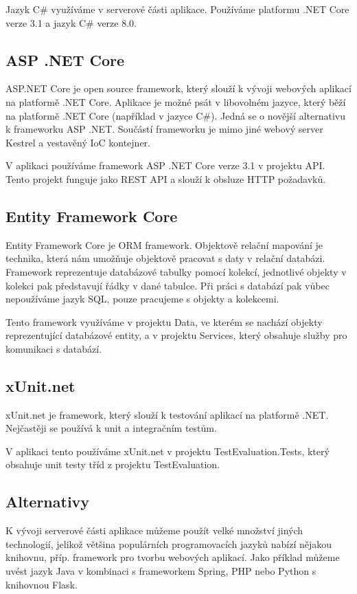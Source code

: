 Jazyk C\# využíváme v serverové části aplikace. Používáme platformu .NET Core verze 3.1 a jazyk C\# verze 8.0.

\subsection{ASP .NET Core}
ASP.NET Core je open source framework, který slouží k vývoji webových aplikací na platformě .NET Core. Aplikace je možné psát v libovolném jazyce, který běží na platformě .NET Core (například v jazyce C\#). Jedná se o novější alternativu k frameworku ASP .NET. Součástí frameworku je mimo jiné webový server Kestrel a vestavěný IoC kontejner.
\cite{AspNetCoreDocs}

V aplikaci používáme framework ASP .NET Core verze 3.1 v projektu API. Tento projekt funguje jako REST API a slouží k obsluze HTTP požadavků.

\subsection{Entity Framework Core}
Entity Framework Core je ORM framework. Objektově relační mapování je technika, která nám umožňuje objektově pracovat s daty v relační databázi. Framework reprezentuje databázové tabulky pomocí kolekcí, jednotlivé objekty v kolekci pak představují řádky v dané tabulce. Při práci s databází pak vůbec nepoužíváme jazyk SQL, pouze pracujeme s objekty a kolekcemi.
\cite{EfCoreDocs}

Tento framework využíváme v projektu Data, ve kterém se nachází objekty reprezentující databázové entity, a v projektu Services, který obsahuje služby pro komunikaci s databází.

\subsection{xUnit.net}
xUnit.net je framework, který slouží k testování aplikací na platformě .NET. Nejčastěji se používá k unit a integračním testům. 
\cite{xUnitDocs}

V aplikaci tento používáme xUnit.net v projektu TestEvaluation.Tests, který obsahuje unit testy tříd z projektu TestEvaluation.

\subsection{Alternativy}

K vývoji serverové části aplikace můžeme použít velké množství jiných technologií, jelikož většina populárních programovacích jazyků nabízí nějakou knihovnu, příp. framework pro tvorbu webových aplikací.  Jako příklad můžeme uvést jazyk Java v kombinaci s frameworkem Spring, PHP nebo Python s knihovnou Flask. 


